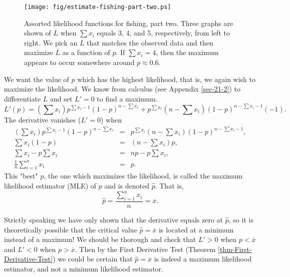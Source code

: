 \begin{figure}[ht!]
\centering
\texttt{[image: fig/estimate-fishing-part-two.ps]}
\caption[Assorted likelihood functions for fishing, part two]{\label{fig-fishing-part-two}\small Assorted likelihood functions for fishing, part two.   Three graphs are shown of \(L\) when \(\sum x_{i}\) equals 3, 4, and 5, respectively, from left to right. We pick an \(L\) that matches the observed data and then maximize \(L\) as a function of \(p\). If \(\sum x_{i}=4\), then the maximum appears to occur somewhere around \(p \approx 0.6\).}
\end{figure}


We want the value of \(p\) which has the highest likelihood, that is,
we again wish to maximize the likelihood. We know from calculus (see
Appendix \ref{sec-21-2}) to differentiate \(L\)
and set \(L'=0\) to find a maximum.  \[ L'(p)=\left(\sum
x_{i}\right)p^{\sum x_{i}-1}(1-p)^{n-\sum x_{i}}+p^{\sum
x_{i}}\left(n-\sum x_{i}\right)(1-p)^{n-\sum x_{i}-1}(-1).  \] The
derivative vanishes (\(L'=0\)) when
\begin{eqnarray*}
\left(\sum x_{i}\right)p^{\sum x_{i}-1}(1-p)^{n-\sum x_{i}} & = & p^{\sum x_{i}}\left(n-\sum x_{i}\right)(1-p)^{n-\sum x_{i}-1},\\
\sum x_{i}(1-p) & = & \left(n-\sum x_{i}\right)p,\\
\sum x_{i}-p\sum x_{i} & = & np-p\sum x_{i},\\
\frac{1}{n}\sum_{i=1}^{n}x_{i} & = & p.
\end{eqnarray*}
This "best" \(p\), the one which maximizes the likelihood, is called
the maximum likelihood estimator (MLE) of \(p\) and is denoted
\(\hat{p}\). That is,
\begin{equation} 
\hat{p}=\frac{\sum_{i=1}^{n}x_{i}}{n}=\overline{x}.
\end{equation}

\begin{rem}
Strictly speaking we have only shown that the derivative equals zero
at \(\hat{p}\), so it is theoretically possible that the critical
value \(\hat{p}=\overline{x}\) is located at a minimum
instead of a maximum! We should be thorough and check that \(L'>0\)
when \(p<\overline{x}\) and \(L'<0\) when \(p>\overline{x}\). Then by
the First Derivative Test (Theorem \ref{thm-First-Derivative-Test}) we could
be certain that \(\hat{p}=\overline{x}\) is indeed a maximum
likelihood estimator, and not a minimum likelihood estimator.
\end{rem}

